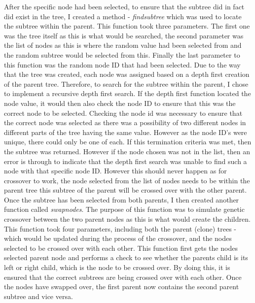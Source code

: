 \documentclass[11pt]{article}
\begin{document}
After the specific node had been selected, to ensure that the subtree did in fact did exist in the tree, I created a method - \textit{find\textunderscore subtree} which was used to locate the subtree within the parent. This function took three parameters. The first one was the tree itself as this is what would be searched, the second parameter was the list of nodes as this is where the random value had been selected from and the random subtree would be selected from this. Finally the last parameter to this function was the random node ID that had been selected. Due to the way that the tree was created, each node was assigned based on a depth first creation of the parent tree. Therefore, to search for the subtree within the parent, I chose to implement a recursive depth first search. If the depth first function located the node value, it would then also check the node ID to ensure that this was the correct node to be selected. Checking the node id was necessary to ensure that the correct node was selected as there was a possibility of two different nodes in different parts of the tree having the same value. However as the node ID's were unique, there could only be one of each. If this termination criteria was met, then the subtree was returned. However if the node chosen was not in the list, then an error is through to indicate that the depth first search was unable to find such a node with that specific node ID. However this should never happen as for crossover to work, the node selected from the list of nodes needs to be within the parent tree this subtree of the parent will be crossed over with the other parent. \\
Once the subtree has been selected from both parents, I then created another function called \textit{swap\textunderscore nodes}. The purpose of this function was to simulate genetic crossover between the two parent nodes as this is what would create the children. This function took four parameters, including both the parent (clone) trees - which would be updated during the process of the crossover, and the nodes selected to be crossed over with each other. This function first gets the nodes selected parent node and performs a check to see whether the parents child is its left or right child, which is the node to be crossed over. By doing this, it is ensured that the correct subtrees are being crossed over with each other. Once the nodes have swapped over, the first parent now contains the second parent subtree and vice versa. \\
\end{document}
